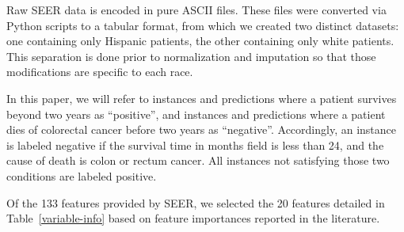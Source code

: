 \documentclass[review]{elsarticle}
\begin{document}
Raw SEER data is encoded in pure ASCII files. These files were converted via Python scripts to a tabular format, from which we created two distinct datasets: one containing only Hispanic patients, the other containing only white patients. This separation is done prior to normalization and imputation so that those modifications are specific to each race.

In this paper, we will refer to instances and predictions where a patient survives beyond two years as “positive”, and instances and predictions where a patient dies of colorectal cancer before two years as “negative”. Accordingly, an instance is labeled negative if the survival time in months field is less than 24, and the cause of death is colon or rectum cancer. All instances not satisfying those two conditions are labeled positive.

Of the 133 features provided by SEER, we selected the 20 features detailed in Table~\ref{variable-info} based on feature importances reported in the literature.
\end{document}

